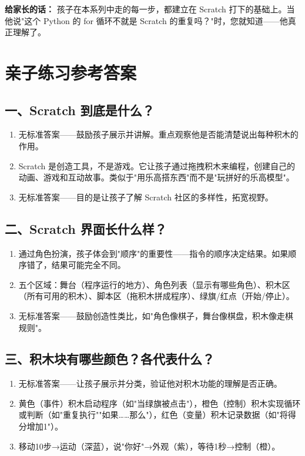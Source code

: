 \documentclass[a4paper,12pt]{ctexart}
\begin{document}
\textbf{给家长的话：} 孩子在本系列中走的每一步，都建立在 Scratch 打下的基础上。当他说"这个 Python 的 for 循环不就是 Scratch 的重复吗？"时，您就知道——他真正理解了。

\section*{\textcolor{blue!70!black}{亲子练习参考答案}}

\subsection*{一、Scratch 到底是什么？}
\begin{enumerate}
  \item 无标准答案——鼓励孩子展示并讲解。重点观察他是否能清楚说出每种积木的作用。
  \item Scratch 是创造工具，不是游戏。它让孩子通过拖拽积木来编程，创建自己的动画、游戏和互动故事。类似于"用乐高搭东西"而不是"玩拼好的乐高模型"。
  \item 无标准答案——目的是让孩子了解 Scratch 社区的多样性，拓宽视野。
\end{enumerate}

\subsection*{二、Scratch 界面长什么样？}
\begin{enumerate}
  \item 通过角色扮演，孩子体会到"顺序"的重要性——指令的顺序决定结果。如果顺序错了，结果可能完全不同。
  \item 五个区域：舞台（程序运行的地方）、角色列表（显示有哪些角色）、积木区（所有可用的积木）、脚本区（拖积木拼成程序）、绿旗/红点（开始/停止）。
  \item 无标准答案——鼓励创造性类比，如"角色像棋子，舞台像棋盘，积木像走棋规则"。
\end{enumerate}

\subsection*{三、积木块有哪些颜色？各代表什么？}
\begin{enumerate}
  \item 无标准答案——让孩子展示并分类，验证他对积木功能的理解是否正确。
  \item 黄色（事件）积木启动程序（如"当绿旗被点击"），橙色（控制）积木实现循环或判断（如"重复执行""如果……那么"），红色（变量）积木记录数据（如"将得分增加1"）。
  \item 移动10步→运动（深蓝），说"你好"→外观（紫），等待1秒→控制（橙）。
\end{enumerate}
\end{document}
